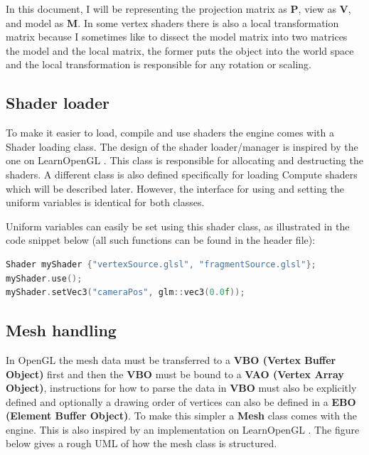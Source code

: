 In this document, I will be representing the projection matrix as $\mathbf{P}$, view as $\mathbf{V}$, and model as $\mathbf{M}$. In some vertex shaders there is also a local transformation matrix because I sometimes like to dissect the model matrix into two matrices the model and the local matrix, the former puts the object into the world space and the local transformation is responsible for any rotation or scaling.

\subsection{Shader loader}
To make it easier to load, compile and use shaders the engine comes with a Shader loading
class. The design of the shader loader/manager is inspired by the one on LearnOpenGL \cite{learnopengl}. This class is responsible for allocating and destructing the shaders. A different class is also defined specifically for loading Compute shaders which will be described later. However, the interface for using and setting the uniform variables is identical for both classes.

Uniform variables can easily be set using this shader class, as illustrated in the code snippet below (all such functions can be found in the header file):
\begin{lstlisting}[language=C++]
Shader myShader {"vertexSource.glsl", "fragmentSource.glsl"};
myShader.use();
myShader.setVec3("cameraPos", glm::vec3(0.0f));
\end{lstlisting}

\subsection{Mesh handling}
\label{subsec:mesh_handling}
In OpenGL the mesh data must be transferred to a \textbf{VBO (Vertex Buffer Object)} first and then the \textbf{VBO} must be bound to a \textbf{VAO (Vertex Array Object)}, instructions for how to parse the data in \textbf{VBO} must also be explicitly defined and optionally a drawing order of vertices can also be defined in a \textbf{EBO (Element Buffer Object)}. To make this simpler a \textbf{Mesh} class comes with the engine. This is also inspired by an implementation on LearnOpenGL \cite{learnopengl}. The figure below gives a rough UML of how the mesh class is structured.

